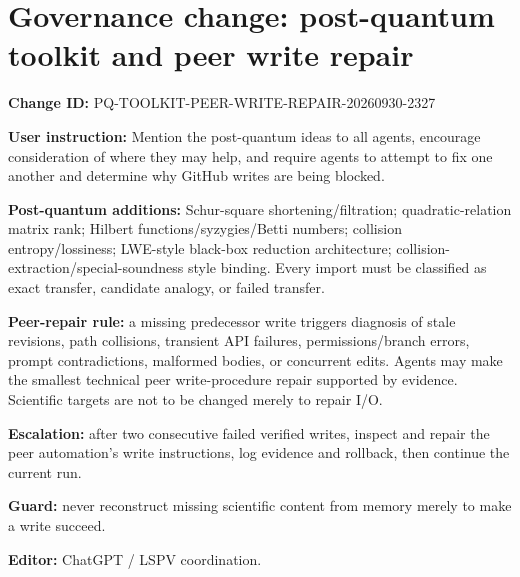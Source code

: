 \documentclass[11pt]{article}
\begin{document}
\section*{Governance change: post-quantum toolkit and peer write repair}
\textbf{Change ID:} PQ-TOOLKIT-PEER-WRITE-REPAIR-20260930-2327

\textbf{User instruction:} Mention the post-quantum ideas to all agents, encourage consideration of where they may help, and require agents to attempt to fix one another and determine why GitHub writes are being blocked.

\textbf{Post-quantum additions:} Schur-square shortening/filtration; quadratic-relation matrix rank; Hilbert functions/syzygies/Betti numbers; collision entropy/lossiness; LWE-style black-box reduction architecture; collision-extraction/special-soundness style binding. Every import must be classified as exact transfer, candidate analogy, or failed transfer.

\textbf{Peer-repair rule:} a missing predecessor write triggers diagnosis of stale revisions, path collisions, transient API failures, permissions/branch errors, prompt contradictions, malformed bodies, or concurrent edits. Agents may make the smallest technical peer write-procedure repair supported by evidence. Scientific targets are not to be changed merely to repair I/O.

\textbf{Escalation:} after two consecutive failed verified writes, inspect and repair the peer automation's write instructions, log evidence and rollback, then continue the current run.

\textbf{Guard:} never reconstruct missing scientific content from memory merely to make a write succeed.

\textbf{Editor:} ChatGPT / LSPV coordination.
\end{document}
